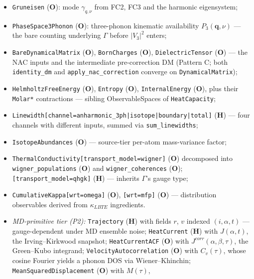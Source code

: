 \documentclass[11pt,a4paper]{article}
\begin{document}
\begin{itemize}[leftmargin=2em, itemsep=0.2em]
  \item \texttt{Gruneisen} (\textbf{O}): mode $\gamma_{q,\nu}$ from FC2, FC3
        and the harmonic eigensystem;
  \item \texttt{PhaseSpace3Phonon} (\textbf{O}): three-phonon kinematic
        availability $P_3(\mathbf{q},\nu)$ --- the bare counting underlying
        $\Gamma$ before $|V_3|^2$ enters;
  \item \texttt{BareDynamicalMatrix} (\textbf{O}), \texttt{BornCharges}
        (\textbf{O}), \texttt{DielectricTensor} (\textbf{O}) ---
        the NAC inputs and the intermediate pre-correction DM
        (Pattern C; both \texttt{identity\_dm} and
        \texttt{apply\_nac\_correction} converge on
        \texttt{DynamicalMatrix});
  \item \texttt{HelmholtzFreeEnergy} (\textbf{O}), \texttt{Entropy}
        (\textbf{O}), \texttt{InternalEnergy} (\textbf{O}), plus their
        \texttt{Molar*} contractions --- sibling ObservableSpaces of
        \texttt{HeatCapacity};
  \item \texttt{Linewidth[channel=anharmonic\_3ph|isotope|boundary|total]}
        (\textbf{H}) --- four channels with different inputs, summed via
        \texttt{sum\_linewidths};
  \item \texttt{IsotopeAbundances} (\textbf{O}) --- source-tier per-atom
        mass-variance factor;
  \item \texttt{ThermalConductivity[transport\_model=wigner]} (\textbf{O})
        decomposed into \texttt{wigner\_populations} (\textbf{O}) and
        \texttt{wigner\_coherences} (\textbf{O});
        \texttt{[transport\_model=qhgk]} (\textbf{H}) --- inherits
        $\Gamma$'s gauge type;
  \item \texttt{CumulativeKappa[wrt=omega]} (\textbf{O}),
        \texttt{[wrt=mfp]} (\textbf{O}) --- distribution observables
        derived from $\kappa_{LBTE}$ ingredients.
  \item \emph{MD-primitive tier (P2):}
        \texttt{Trajectory} (\textbf{H}) with fields $r$, $v$ indexed
        $(i,\alpha,t)$ --- gauge-dependent under MD ensemble noise;
        \texttt{HeatCurrent} (\textbf{H}) with $J(\alpha,t)$, the
        Irving--Kirkwood snapshot;
        \texttt{HeatCurrentACF} (\textbf{O}) with
        $J^{corr}(\alpha,\beta,\tau)$, the Green--Kubo integrand;
        \texttt{VelocityAutocorrelation} (\textbf{O}) with $C_v(\tau)$,
        whose cosine Fourier yields a phonon DOS via Wiener--Khinchin;
        \texttt{MeanSquaredDisplacement} (\textbf{O}) with $M(\tau)$,

\end{itemize}
\end{document}
